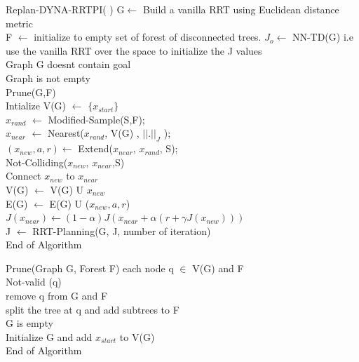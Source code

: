 \documentclass[MTech]{iitmdiss}
\begin{document}
\begin{algorithm}{Replan-DYNA-RRTPI( )}{
\label{algo:Replan-DYNA-RRTPI}
}
G$\leftarrow$ Build a vanilla RRT using Euclidean distance metric\\
F $\leftarrow$ initialize to empty set of forest of disconnected trees.
$J_o \leftarrow$ NN-TD(G) i.e use the vanilla RRT over the space to initialize the J values\\ 
\qwhile Graph G doesnt contain goal \\
\qif Graph is not empty \\
\qthen Prune(G,F)\\
\qelse Intialize V(G) $\leftarrow$ $\{x_{start} \}$\qfi\\
$x_{rand}$ $\leftarrow$ Modified-Sample(S,F);\\
$x_{near}$ $\leftarrow$ Nearest($x_{rand}$, V(G) , $|| . ||_J $ );\\
$(x_{new}, a, r) \leftarrow$ Extend($x_{near}$, $x_{rand}$, S);\\
\qif Not-Colliding($x_{new}$, $x_{near}$,S)\\
\qthen Connect $x_{new}$ to $x_{near}$\\
V(G) $\leftarrow$ V(G) U {$ x_{new}$ }\\
E(G) $\leftarrow$ E(G) U ($x_{new}, a, r$)\\
$J(x_{near}) \leftarrow (1 - \alpha) J (x_{near} + \alpha (r + \gamma J(x_{new})))$ \qfi\\
J $\leftarrow$ RRT-Planning(G, J, number of iteration)\qend\\
End of Algorithm
\end{algorithm}

\begin{algorithm}{Prune(Graph G, Forest F)}{
\label{algo:Prune}
}
\qfor each node q $\in$ V(G) and F\\
\qif Not-valid (q)\\
\qthen remove q from G and F\\
split the tree at q and add subtrees to F\qfi\qrof\\
\qif G is empty \\
\qthen Initialize G and add $x_{start}$ to V(G)\qfi\\
End of Algorithm
\end{algorithm}
\end{document}
